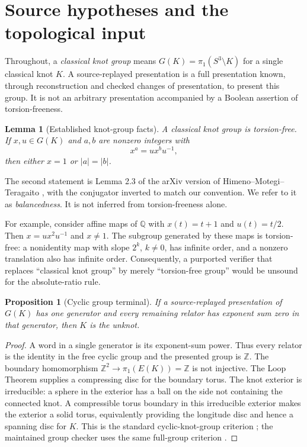 \documentclass[11pt]{article}
\newtheorem{lemma}[theorem]{Lemma}
\newtheorem{proposition}[theorem]{Proposition}
\theoremstyle{definition}\newtheorem{definition}[theorem]{Definition}
\theoremstyle{remark}\newtheorem{remark}[theorem]{Remark}
\newcommand{\Z}{\mathbb Z}\newcommand{\Q}{\mathbb Q}\newcommand{\F}{\mathbb F}
\begin{document}
\section{Source hypotheses and the topological input}
\label{sec:background}
Throughout, a \emph{classical knot group} means
$G(K)=\pi_1(S^3\setminus K)$ for a single classical knot $K$. A source-replayed
presentation is a full presentation known, through reconstruction and checked
changes of presentation, to present this group. It is not an arbitrary
presentation accompanied by a Boolean assertion of torsion-freeness.

\begin{lemma}[Established knot-group facts]\label{lem:balanced}
A classical knot group is torsion-free. If $x,u\in G(K)$ and $a,b$ are
nonzero integers with
\[
 x^a=u x^b u^{-1},
\]
then either $x=1$ or $|a|=|b|$.
\end{lemma}
The second statement is Lemma 2.3 of the arXiv version of
Himeno--Motegi--Teragaito \cite{HMT}, with the conjugator inverted to match
our convention. We refer to it as \emph{balancedness}. It is not inferred
from torsion-freeness alone.

For example, consider affine maps of $\Q$ with $x(t)=t+1$ and $u(t)=t/2$.
Then $x=u x^2u^{-1}$ and $x\ne1$. The subgroup generated by these maps is
torsion-free: a nonidentity map with slope $2^k$, $k\ne0$, has infinite
order, and a nonzero translation also has infinite order. Consequently,
a purported verifier that replaces ``classical knot group'' by merely
``torsion-free group'' would be unsound for the absolute-ratio rule.

\begin{proposition}[Cyclic group terminal]\label{prop:terminal}
If a source-replayed presentation of $G(K)$ has one generator and every
remaining relator has exponent sum zero in that generator, then $K$ is
the unknot.
\end{proposition}
\begin{proof}
A word in a single generator is its exponent-sum power. Thus every relator
is the identity in the free cyclic group and the presented group is $\Z$.
The boundary homomorphism $\Z^2\to\pi_1(E(K))=\Z$ is not injective.
The Loop Theorem supplies a compressing disc for the boundary torus. The
knot exterior is irreducible: a sphere in the exterior has a ball on the
side not containing the connected knot. A compressible torus boundary in
this irreducible exterior makes the exterior a solid torus, equivalently
providing the longitude disc and hence a spanning disc for $K$. This is
the standard cyclic-knot-group criterion \cite{Papakyriakopoulos}; the
maintained group checker uses the same full-group criterion \cite{Repo}.
\end{proof}
\end{document}
